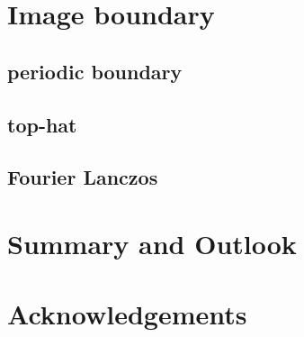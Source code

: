 \documentclass[a4paper,fleqn,usenatbib]{mnras}
\begin{document}
\section{Image boundary}
\label{sec:Boundary}

\subsection{periodic boundary}



\subsection{top-hat}


\subsection{Fourier Lanczos}


\section{Summary and Outlook}
\label{sec:Summary}


\section*{Acknowledgements}



\appendix

\bsp	%
\label{lastpage}
\end{document}
